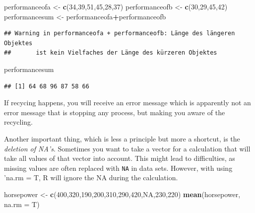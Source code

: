 \documentclass[]{report}
\newenvironment{Shaded}{\begin{snugshade}}{\end{snugshade}}
\newcommand{\KeywordTok}[1]{\textcolor[rgb]{0.13,0.29,0.53}{\textbf{#1}}}
\newcommand{\DataTypeTok}[1]{\textcolor[rgb]{0.13,0.29,0.53}{#1}}
\newcommand{\DecValTok}[1]{\textcolor[rgb]{0.00,0.00,0.81}{#1}}
\newcommand{\StringTok}[1]{\textcolor[rgb]{0.31,0.60,0.02}{#1}}
\newcommand{\OtherTok}[1]{\textcolor[rgb]{0.56,0.35,0.01}{#1}}
\newcommand{\OperatorTok}[1]{\textcolor[rgb]{0.81,0.36,0.00}{\textbf{#1}}}
\newcommand{\NormalTok}[1]{#1}
\begin{document}
\begin{Shaded}
\begin{Highlighting}[]
\NormalTok{performanceofa <-}\StringTok{ }\KeywordTok{c}\NormalTok{(}\DecValTok{34}\NormalTok{,}\DecValTok{39}\NormalTok{,}\DecValTok{51}\NormalTok{,}\DecValTok{45}\NormalTok{,}\DecValTok{28}\NormalTok{,}\DecValTok{37}\NormalTok{)}
\NormalTok{performanceofb <-}\StringTok{ }\KeywordTok{c}\NormalTok{(}\DecValTok{30}\NormalTok{,}\DecValTok{29}\NormalTok{,}\DecValTok{45}\NormalTok{,}\DecValTok{42}\NormalTok{)}
\NormalTok{performancesum <-}\StringTok{ }\NormalTok{performanceofa}\OperatorTok{+}\NormalTok{performanceofb}
\end{Highlighting}
\end{Shaded}

\begin{verbatim}
## Warning in performanceofa + performanceofb: Länge des längeren Objektes
##       ist kein Vielfaches der Länge des kürzeren Objektes
\end{verbatim}

\begin{Shaded}
\begin{Highlighting}[]
\NormalTok{performancesum}
\end{Highlighting}
\end{Shaded}

\begin{verbatim}
## [1] 64 68 96 87 58 66
\end{verbatim}

If recycing happens, you will receive an error message which is
apparently not an error message that is stopping any process, but making
you aware of the recycling.

Another important thing, which is less a principle but more a shortcut,
is the \emph{deletion of NA's}. Sometimes you want to take a vector for
a calculation that will take all values of that vector into account.
This might lead to difficulties, as missing values are often replaced
with \texttt{NA} in data sets. However, with using 'na.rm = T, R will
ignore the NA during the calculation.

\begin{Shaded}
\begin{Highlighting}[]
\NormalTok{horsepower <-}\StringTok{ }\KeywordTok{c}\NormalTok{(}\DecValTok{400}\NormalTok{,}\DecValTok{320}\NormalTok{,}\DecValTok{190}\NormalTok{,}\DecValTok{200}\NormalTok{,}\DecValTok{310}\NormalTok{,}\DecValTok{290}\NormalTok{,}\DecValTok{420}\NormalTok{,}\OtherTok{NA}\NormalTok{,}\DecValTok{230}\NormalTok{,}\DecValTok{220}\NormalTok{)}
\KeywordTok{mean}\NormalTok{(horsepower, }\DataTypeTok{na.rm =}\NormalTok{ T)}
\end{Highlighting}
\end{Shaded}
\end{document}
